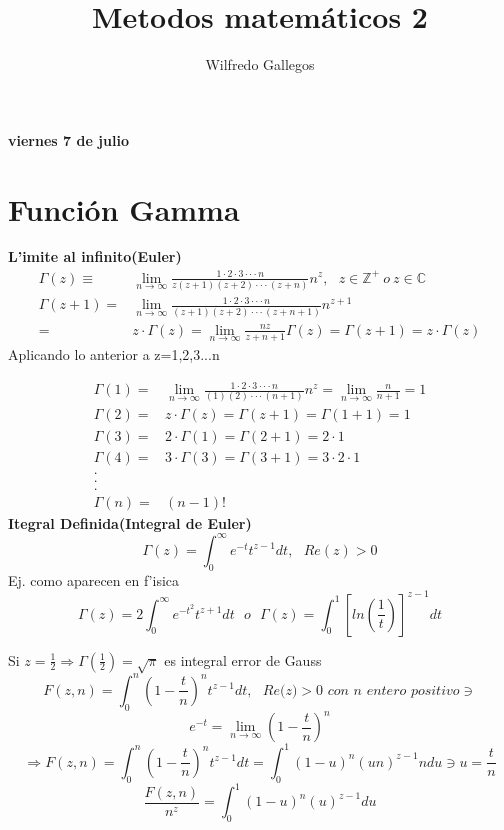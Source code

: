 \documentclass{article}
\title{Metodos matemáticos 2}
\author{Wilfredo Gallegos}
\theoremstyle{definition}
\begin{document}
\maketitle

\textbf{viernes 7 de julio}
\section{Función Gamma}
\textbf{L'imite al infinito(Euler)}\\

\[\begin{array}{rl}
	\Gamma (z)\equiv & \lim\limits_{n\to \infty} \frac{1\cdot 2\cdot 3\cdot\cdot\cdot n}{z(z+1)(z+2)\cdot\cdot\cdot (z+n)}n^z,\ \ \ z\in\mathbb{Z}^{+}\ o\ z\in\mathbb{C}\\
	\Gamma(z+1)=& \lim\limits_{n\to \infty} \frac{1\cdot 2\cdot 3\cdot\cdot\cdot n}{(z+1)(z+2)\cdot\cdot\cdot (z+n+1)}n^{z+1}\\
	=& z\cdot\Gamma (z)= \lim\limits_{n\to \infty}\frac{nz}{z+n+1}\Gamma (z)=\Gamma (z+1)=z\cdot\Gamma (z)
\end{array}\]
Aplicando lo anterior a z=1,2,3...n

\[\begin{array}{rl}

	\Gamma (1)=& \lim\limits_{n\to \infty} \frac{1\cdot 2\cdot 3\cdot\cdot\cdot n}{(1)(2)\cdot\cdot\cdot (n+1)}n^z= \lim\limits_{n\to \infty}\frac{n}{n+1}=1\\
	\Gamma (2)=& z\cdot \Gamma (z)= \Gamma (z+1)=\Gamma (1+1)=1\\
	\Gamma (3)=& 2\cdot \Gamma (1)= \Gamma (2+1)=2\cdot 1\\
	\Gamma (4)=& 3\cdot \Gamma (3)= \Gamma (3+1)=3\cdot 2\cdot 1\\
	.\\
	.\\
	.\\
	\Gamma (n)=&(n-1)!

\end{array}\]
\textbf{Itegral Definida(Integral de Euler)}
\[\Gamma (z)=\int^{\infty}_0 e^{-t}t^{z-1}dt,\ \ \ Re(z)>0\]
Ej. como aparecen en f'isica
\[\Gamma (z)= 2\int^{\infty}_0 e^{-t^2}t^{z+1}dt\ \ \ o \ \ \ \Gamma (z) = \int^1_0\left[ln(\frac{1}{t})\right]^{z-1}dt\]

Si $z=\frac{1}{2}\Rightarrow \Gamma (\frac{1}{2}) = \sqrt{\pi}$ es integral error de Gauss
\[F(z,n)=\int^n_0\left(1-\frac{t}{n}\right)^nt^{z-1}dt,\ \ \ \textit{Re(z)}>\textit{0 con n entero positivo}\ni\]
\[e^{-t}=\lim\limits_{n\to \infty}\left(1-\frac{t}{n}\right)^n\]
\[\Rightarrow F(z,n)=\int^n_0\left(1-\frac{t}{n}\right)^nt^{z-1}dt = \int^1_0 (1-u)^n(un)^{z-1}ndu\ni u=\frac{t}{n}\]
\[\frac{F(z,n)}{n^z}=\int^1_0 (1-u)^n(u)^{z-1}du\]\\
\end{document}
